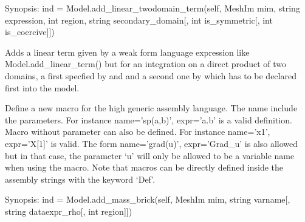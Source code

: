\documentclass[a4paper,11pt,english]{sphinxmanual}
\begin{document}
\begin{fulllineitems}

\begin{fulllineitems}
\label{\detokenize{python/cmdref_Model:getfem.Model.add_linear_twodomain_term}}
Synopsis: ind = Model.add\_linear\_twodomain\_term(self, MeshIm mim, string expression, int region, string secondary\_domain{[}, int is\_symmetric{[}, int is\_coercive{]}{]})

Adds a linear term given by a weak form language expression like
Model.add\_linear\_term() but for an integration on a direct
product of two domains, a first specfied by  and 
and a second one by  which has to be declared
first into the model.

\end{fulllineitems}


\begin{fulllineitems}
\label{\detokenize{python/cmdref_Model:getfem.Model.add_macro}}
Define a new macro for the high generic assembly language.
The name include the parameters. For instance name=’sp(a,b)’, expr=’a.b’
is a valid definition. Macro without parameter can also be defined.
For instance name=’x1’, expr=’X{[}1{]}’ is valid. The form name=’grad(u)’,
expr=’Grad\_u’ is also allowed but in that case, the parameter ‘u’ will
only be allowed to be a variable name when using the macro. Note that
macros can be directly defined inside the assembly strings with the
keyword ‘Def’.

\end{fulllineitems}


\begin{fulllineitems}
\label{\detokenize{python/cmdref_Model:getfem.Model.add_mass_brick}}
Synopsis: ind = Model.add\_mass\_brick(self, MeshIm mim, string varname{[}, string dataexpr\_rho{[}, int region{]}{]})


\end{fulllineitems}
\end{fulllineitems}
\end{document}
